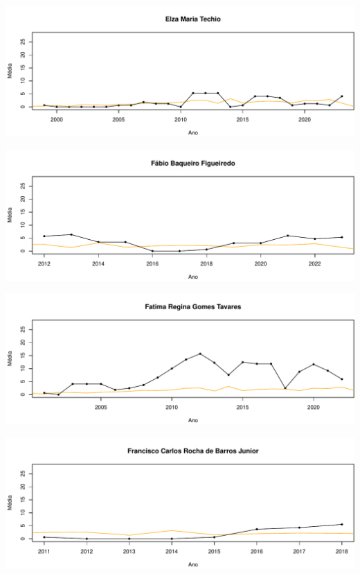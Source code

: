 \documentclass[12pt,brazil]{article}\usepackage[]{graphicx}\usepackage[]{xcolor}
\makeatletter
\def\maxwidth{ %
  \ifdim\Gin@nat@width>\linewidth
    \linewidth
  \else
    \Gin@nat@width
  \fi
}
\makeatother
\begin{document}
\vspace{0.5cm}


{\centering \includegraphics[width=\maxwidth]{figure/mediamovel-14} 

}



\vspace{0.5cm}


{\centering \includegraphics[width=\maxwidth]{figure/mediamovel-15} 

}



\vspace{0.5cm}


{\centering \includegraphics[width=\maxwidth]{figure/mediamovel-16} 

}



\vspace{0.5cm}


{\centering \includegraphics[width=\maxwidth]{figure/mediamovel-17} 

}
\end{document}
